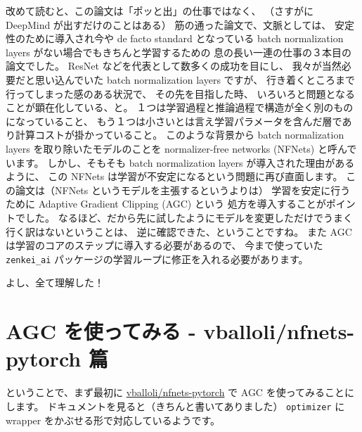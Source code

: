 \documentclass[dvipdfmx,autodetect-engine,10pt,b5paper,papersize,openany,dvipsnames]{jsbook}
\begin{document}
\begin{multicols}{2}
改めて読むと、この論文は「ポッと出」の仕事ではなく、
（さすがに DeepMind が出すだけのことはある）
筋の通った論文で、文脈としては、
安定性のために導入され今や de facto standard となっている
batch normalization layers がない場合でもきちんと学習するための
息の長い一連の仕事の３本目の論文でした。
ResNet などを代表として数多くの成功を目にし、
我々が当然必要だと思い込んでいた batch normalization layers ですが、
行き着くところまで行ってしまった感のある状況で、
その先を目指した時、
いろいろと問題となることが顕在化している、と。
１つは学習過程と推論過程で構造が全く別のものになっていること、
もう１つは小さいとは言え学習パラメータを含んだ層であり計算コストが掛かっていること。
このような背景から batch normalization layers を取り除いたモデルのことを
normalizer-free networks (NFNets) と呼んでいます。
しかし、そもそも batch normalization layers が導入された理由があるように、
この NFNets は学習が不安定になるという問題に再び直面します。
この論文は（NFNets というモデルを主張するというよりは）
学習を安定に行うために Adaptive Gradient Clipping (AGC) という
処方を導入することがポイントでした。
なるほど、だから先に試したようにモデルを変更しただけでうまく行く訳はないということは、
逆に確認できた、ということですね。
また AGC は学習のコアのステップに導入する必要があるので、
今まで使っていた \texttt{zenkei\_ai} パッケージの学習ループに修正を入れる必要があります。

よし、全て理解した！


\section{AGC を使ってみる - vballoli/nfnets-pytorch 篇}
ということで、まず最初に
\href{https://github.com/vballoli/nfnets-pytorch}{vballoli/nfnets-pytorch}
で AGC を使ってみることにします。
ドキュメントを見ると（きちんと書いてありました）
\texttt{optimizer} に wrapper をかぶせる形で対応しているようです。



\end{multicols}
\end{document}
